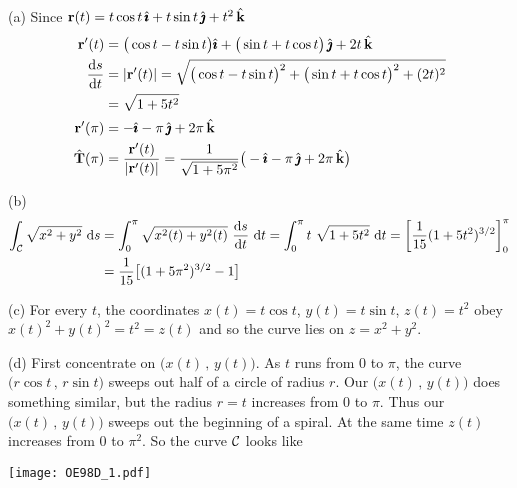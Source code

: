 \begin{solution} 
	(a) Since $\mathbf{r}(t)=t\cos t\,\hat{\pmb{\imath}}+t\sin t\,\hat{\pmb{\jmath}}+t^2\,\hat{\mathbf{k}}$
	\begin{align*}
		\vr'(t)&=\big(\cos t-t\sin t\big)\hi+\big(\sin t+t\cos t\big)\,\hj+2t\,\hk\\
		\diff{s}{t}
		&=|\vr'(t)|
		=\sqrt{\big(\cos t-t\sin t\big)^2+\big(\sin t+t\cos t\big)^2+(2t)^2}\\
		&=\sqrt{1+5t^2}\\
		\vr'(\pi)&=-\hi-\pi\,\hj+2\pi\,\hk\\
		\hat\vT(\pi)&=\frac{\vr'(t)}{|\vr'(t)|}
		=\frac{1}{\sqrt{1+5\pi^2}}\big(-\hi-\pi\,\hj+2\pi\,\hk\big)
	\end{align*}
	
	(b)
	\begin{align*}
		\int_\cC \sqrt{x^2+y^2}\ \dee{s}
		&=\int_0^\pi \sqrt{x^2(t)+y^2(t)}\ \diff{s}{t}\ \dee{t}
		=\int_0^\pi t\ \sqrt{1+5t^2}\ \dee{t}
		=\left[\frac{1}{15}(1+5t^2)^{3/2}\right]_0^\pi \\
		&=\frac{1}{15}\big[(1+5\pi^2)^{3/2}-1\big]
	\end{align*}
	
	(c) For every $t$, the coordinates $x(t)=t\cos t$, $y(t)=t\sin t$, 
	$z(t)=t^2$ obey $x(t)^2+y(t)^2= t^2 = z(t)$ and so the curve lies on
	$z=x^2+y^2$.
	
	(d) First concentrate on $\big(x(t)\,,\,y(t)\big)$. As $t$ runs from $0$
	to $\pi$, the curve $\big(r\cos t\,,\,r\sin t\big)$ sweeps out 
	half of a circle of radius $r$. Our  $\big(x(t)\,,\,y(t)\big)$
	does something similar, but the radius $r=t$ increases from $0$
	to $\pi$. Thus our $\big(x(t)\,,\,y(t)\big)$
	sweeps out the beginning of a spiral. At the same time $z(t)$
	increases from $0$ to $\pi^2$. So the curve $\mathcal{C}$ looks like
	
	\begin{center}
		\texttt{[image: OE98D\_1.pdf]}
	\end{center}
	
\end{solution}

